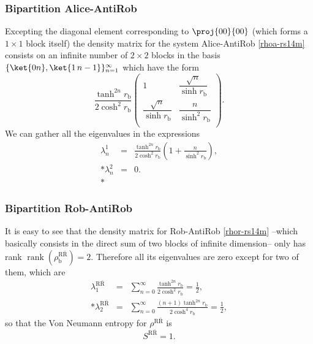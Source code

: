 \subsubsection{Bipartition Alice-AntiRob}

Excepting the diagonal element corresponding to $\proj{00}{00}$ (which forms a $1\times1$ block itself) the density matrix for the system Alice-AntiRob \eqref{rhoa-rs14m} consists on an infinite number of $2\times2$ blocks in the basis $\{\ket{0 n},\ket{1\, n-1}\}_{n=1}^\infty$ which have the form
\begin{equation}
\frac{\tanh^{2n}r_\text{b}}{2\cosh^2 r_\text{b}}
\left(\!\begin{array}{cc}
1 & \dfrac{\sqrt{n}}{\sinh r_\text{b}} \\
\dfrac{\sqrt{n}}{\sinh r_\text{b}} & \dfrac{n}{\sinh^2 r_\text{b}}\\
\end{array}\!\right).
\end{equation}
We can gather all the eigenvalues in the expressions
\begin{eqnarray}\label{eigAaR4m}
\nonumber\lambda^1_n&=&\frac{\tanh^{2n}r_\text{b}}{2\cosh^2 r_\text{b}}\left(1+\frac{n}{\sinh^2r_\text{b}}\right),\\*
\nonumber \lambda^2_n&=&0.\\*
\end{eqnarray}

\subsubsection{Bipartition Rob-AntiRob} 


It is easy to see that the density matrix for Rob-AntiRob  \eqref{rhor-rs14m} --which basically consists in the direct sum of two blocks of infinite dimension-- only has rank $\operatorname{rank}(\rho^{\text{R}{\bar{\text{R}}}}_\text{b})=2$. Therefore all its eigenvalues are zero except for two of them, which are
\begin{eqnarray}\label{eigRaR4m}
\nonumber\lambda^{\text{R}{\bar{\text{R}}}}_1&=&\sum_{n=0}^{\infty}\frac{\tanh^{2n}r_\text{b}}{2\cosh^2r_\text{b}}=\frac12\label{lambda1RaR},\\*\label{lambda2RaR}
\lambda^{\text{R}{\bar{\text{R}}}}_2&=&\sum_{n=0}^{\infty}\frac{(n+1)\tanh^{2n}r_\text{b}}{2\cosh^4r_\text{b}}=\frac12,
\end{eqnarray}
so that the Von Neumann entropy for $\rho^{\text{R}{\bar{\text{R}}}}$ is
\begin{equation}\label{entrop}
S^{\text{R}{\bar{\text{R}}}}=1.
\end{equation}

